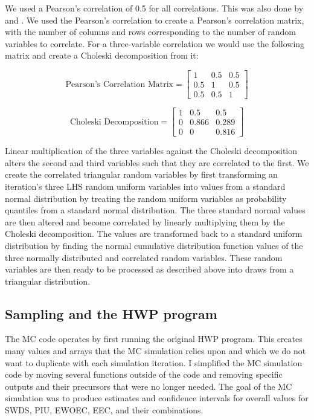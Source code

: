 \documentclass[
  openany]{book}
\begin{document}
We used a Pearson's correlation of 0.5 for all correlations. This was also done by \textcite{anderson2013} and \textcite{stockmann2012}. We used the Pearson's correlation to create a Pearson's correlation matrix, with the number of columns and rows corresponding to the number of random variables to correlate. For a three-variable correlation we would use the following matrix and create a Choleski decomposition from it:

\[ \text{Pearson's Correlation Matrix} = \begin{bmatrix}
       1 & 0.5 & 0.5           \\
       0.5 & 1  & 0.5 \\
       0.5 & 0.5 & 1
     \end{bmatrix}
\]

\[ \text{Choleski Decomposition} = \begin{bmatrix}
       1 & 0.5 & 0.5           \\
       0 & 0.866  & 0.289 \\
       0 & 0 & 0.816
     \end{bmatrix}
\]

Linear multiplication of the three variables against the Choleski decomposition alters the second and third variables such that they are correlated to the first. We create the correlated triangular random variables by first transforming an iteration's three LHS random uniform variables into values from a standard normal distribution by treating the random uniform variables as probability quantiles from a standard normal distribution. The three standard normal values are then altered and become correlated by linearly multiplying them by the Choleski decomposition. The values are transformed back to a standard uniform distribution by finding the normal cumulative distribution function values of the three normally distributed and correlated random variables. These random variables are then ready to be processed as described above into draws from a triangular distribution.

\hypertarget{model-mc-samphwp}{%
\subsection{Sampling and the HWP program}\label{model-mc-samphwp}}

The MC code operates by first running the original HWP program. This creates many values and arrays that the MC simulation relies upon and which we do not want to duplicate with each simulation iteration. I simplified the MC simulation code by moving several functions outside of the code and removing specific outputs and their precursors that were no longer needed. The goal of the MC simulation was to produce estimates and confidence intervals for overall values for SWDS, PIU, EWOEC, EEC, and their combinations.
\end{document}
